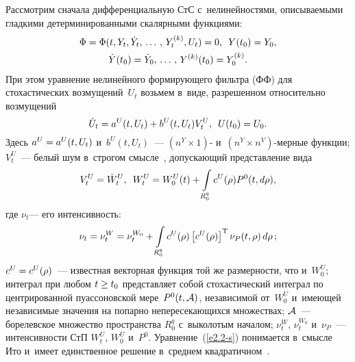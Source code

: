 \begin{multicols}{2}
Рассмотрим сначала дифференциальную СтС с~нелинейностями, описываемыми гладкими 
детерминированными скалярными функциями:
   \begin{multline}
   \Phi =\Phi(t, Y_t, \dot Y_t ,\,\ldots\,,\, Y_t^{(k)}, U_t) =0, \enskip Y(t_0) = Y_0, 
\\
 \dot Y(t_0) = \dot Y_0 ,\,\ldots\,,\, Y^{(k)} (t_0) = Y_0^{(k)}.
\label{e2.1-s}
\end{multline}
При этом уравнение  нелинейного формирующего фильтра (ФФ) для стохастических 
возмущений~$U_t$ возьмем в~виде, разрешенном относительно возмущений
\begin{equation}
\dot U_t = a^U (t, U_t)  + b^U (t, U_t) V_t^U, \enskip U(t_0) = U_0.
\label{e2.2-s}
\end{equation}
Здесь $a^U \hm= a^U(t, U_t)$ и~$b^U(t, U_t)$~--- $(n^Y\times 1)$- и~$(n^Y\times n^V)$-мер\-ные функции; $V_t^U$~--- белый шум в~строгом смысле~\cite{11-s}, допускающий 
представление вида
\begin{equation*}
V_t^U = \dot W_t^U, \enskip W_t^U = W_0^U (t) + \int\limits_{R_0^q} c^U (\rho) 
P^0 ( t, d\rho),
\end{equation*}
где $\nu_t$--- его интенсивность:
    \begin{equation*}
    \nu_t=\nu_t^W =\nu_t^{W_0} +  \int\limits_{R_0^q} c^U (\rho) \left[c^U (\rho)\right]^{\mathrm{T}} \nu_P 
(t,\rho) \,d\rho\,;
\end{equation*}
 $c^U \hm= c^U(\rho)$~--- известная векторная функция той же 
размерности, что и~$W_0^U$; интеграл при любом $t\hm\ge t_0$ представляет собой 
стохастический интеграл по центрированной пуассоновской мере~$P^0(t,{\cal A})$, 
независимой от~$W_0^U$ и~име\-ющей независимые значения на попарно 
непересекающихся множествах; ${\cal A}$~--- борелевское множество пространства 
$R_0^q$ с~выколотым началом; $\nu_t^W$, $\nu_t^{W_0}$ и~$\nu_P$~--- интенсивности СтП 
$W_t^U$, $W_{0}^U$ и~$P^0$. Уравнение~(\ref{e2.2-s}) понимается в~смысле Ито и~имеет 
единственное решение в~среднем квадратичном~\cite{11-s}.



\end{multicols}
